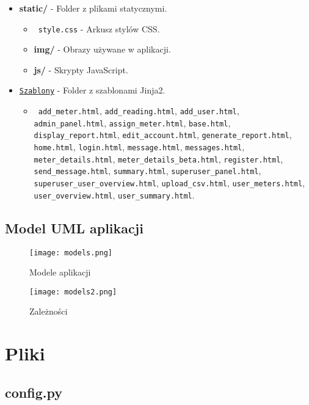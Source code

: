 \documentclass[12pt,a4paper]{report}
\begin{document}
\begin{itemize}
    \item \textbf{static/} - Folder z plikami statycznymi.
    \begin{itemize}
        \item \texttt{ style.css} - Arkusz stylów CSS.
        \item \textbf{ img/} - Obrazy używane w aplikacji.
        \item \textbf{ js/} - Skrypty JavaScript.
    \end{itemize}

    \item \hyperref[sec:templates]{\texttt{Szablony}} - Folder z szablonami Jinja2.
    \begin{itemize}
        \item \texttt{ add\_meter.html}, \texttt{add\_reading.html}, \texttt{add\_user.html}, \texttt{admin\_panel.html}, \texttt{assign\_meter.html}, \texttt{base.html}, \texttt{display\_report.html}, \texttt{edit\_account.html}, \texttt{generate\_report.html}, \texttt{home.html}, \texttt{login.html}, \texttt{message.html}, \texttt{messages.html}, \texttt{meter\_details.html}, \texttt{meter\_details\_beta.html}, \texttt{register.html}, \texttt{send\_message.html}, \texttt{summary.html}, \texttt{superuser\_panel.html}, \texttt{superuser\_user\_overview.html}, \texttt{upload\_csv.html}, \texttt{user\_meters.html}, \texttt{user\_overview.html}, \texttt{user\_summary.html}.
    \end{itemize}
\end{itemize}
\section{Model UML aplikacji}
\begin{figure}
    \centering
    \texttt{[image: models.png]}
    \caption{Modele aplikacji}
    \label{fig:enter-label}
\end{figure}
\begin{figure}
    \centering
    \texttt{[image: models2.png]}
    \caption{Zależności}
    \label{fig:enter-label}
\end{figure}

\newpage
\chapter{Pliki}
\section{config.py}
\label{sec:config}
\end{document}
